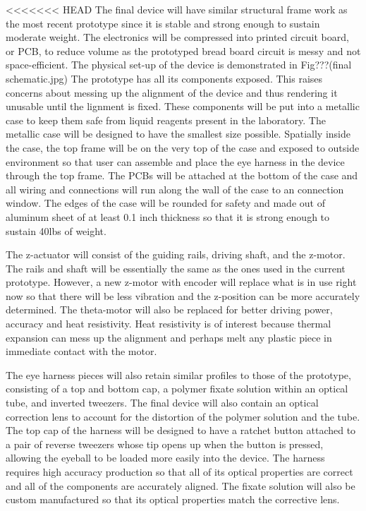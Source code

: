 \documentclass{article}
\begin{document}
<<<<<<< HEAD
The final device will have similar structural frame work as the most recent prototype since it is stable and 
strong enough to sustain moderate weight. The electronics will be compressed into printed circuit board, or 
PCB, to reduce volume as the prototyped bread board circuit is messy and not space-efficient. The 
physical set-up of the device is demonstrated in Fig???(final schematic.jpg) The prototype has all its 
components exposed. This raises concerns about messing up the alignment of the device and thus 
rendering it unusable until the lignment is fixed. These components will be put into a metallic case to keep 
them safe from liquid reagents present in the laboratory. The metallic case will be designed to have the 
smallest size possible. Spatially inside the case, the top frame will be on the very top of the case and 
exposed to outside environment so that user can assemble and place the eye harness in the device 
through the top frame. The PCBs will be attached at the bottom of the case and all wiring and connections 
will run along the wall of the case to an connection window. The edges of the case will be rounded for 
safety and made out of aluminum sheet of at least 0.1 inch thickness so that it is strong enough to sustain 
40lbs of weight. 

The z-actuator will consist of the guiding rails, driving shaft, and the z-motor. The rails and shaft will be essentially the same as the ones used in the current prototype. However, a new z-motor with encoder will replace what is in use right now so that there will be less vibration and the z-position can be more accurately determined. The theta-motor will also be replaced for better driving power, accuracy and heat resistivity. Heat resistivity is of interest because thermal expansion can mess up the alignment and perhaps melt any plastic piece in immediate contact with the motor.

The eye harness pieces will also retain similar profiles to those of the prototype, consisting of a top and bottom cap, a polymer fixate solution within an optical tube, and inverted tweezers.  The final device will also contain an optical correction lens to account for the distortion of the polymer solution and the tube. The top cap of the harness will be designed to have a ratchet button attached to a pair of reverse tweezers whose tip opens up when the button is pressed, allowing the eyeball to be loaded more easily into the device. The harness requires high accuracy production so that all of its optical properties are correct and all of the components are accurately aligned. The fixate solution will also be custom manufactured so that its optical properties match the corrective lens.
\end{document}
